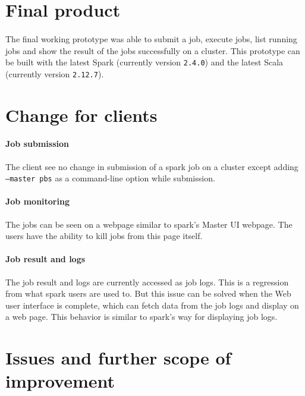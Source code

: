 
\section{Final product}

\paragraph{} The final working prototype was able to submit a job, execute jobs,
list running jobs and show the result of the jobs successfully on a
 cluster. This prototype can be built with the latest Spark
(currently version \texttt{2.4.0}) and the latest Scala (currently version
\texttt{2.12.7}).


\section{Change for clients}

\paragraph{Job submission} The client see no change in submission of a
\gls{spark} job on a  cluster except adding \texttt{--master pbs}
as a command-line option while submission.

\paragraph{Job monitoring} The jobs can be seen on a webpage similar to
\gls{spark}'s Master UI webpage. The users have the ability to kill jobs from
this page itself.

\paragraph{Job result and logs} The job result and logs are currently accessed
as  job logs. This is a regression from what \gls{spark} users
are used to. But this issue can be solved when the Web user interface is
complete, which can fetch data from the job logs and display on a web page. This
behavior is similar to \gls{spark}'s way for displaying job logs.


\section{Issues and further scope of improvement}

